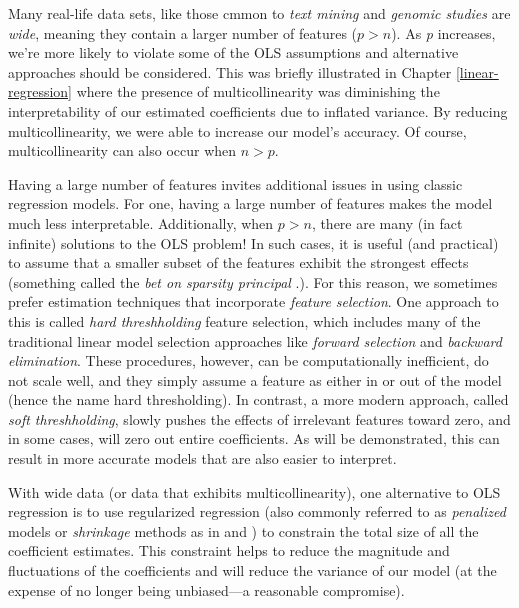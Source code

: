 \documentclass[]{krantz}
\begin{document}
Many real-life data sets, like those cmmon to \emph{text mining} and \emph{genomic studies} are \emph{wide}, meaning they contain a larger number of features (\(p > n\)). As \emph{p} increases, we're more likely to violate some of the OLS assumptions and alternative approaches should be considered. This was briefly illustrated in Chapter \ref{linear-regression} where the presence of multicollinearity was diminishing the interpretability of our estimated coefficients due to inflated variance. By reducing multicollinearity, we were able to increase our model's accuracy. Of course, multicollinearity can also occur when \(n > p\).

Having a large number of features invites additional issues in using classic regression models. For one, having a large number of features makes the model much less interpretable. Additionally, when \(p > n\), there are many (in fact infinite) solutions to the OLS problem! In such cases, it is useful (and practical) to assume that a smaller subset of the features exhibit the strongest effects (something called the \emph{bet on sparsity principal} \citep[see][p.~2]{hastie2015statistical}.). For this reason, we sometimes prefer estimation techniques that incorporate \emph{feature selection}. One approach to this is called \emph{hard threshholding} feature selection, which includes many of the traditional linear model selection approaches like \emph{forward selection} and \emph{backward elimination}. These procedures, however, can be computationally inefficient, do not scale well, and they simply assume a feature as either in or out of the model (hence the name hard thresholding). In contrast, a more modern approach, called \emph{soft threshholding}, slowly pushes the effects of irrelevant features toward zero, and in some cases, will zero out entire coefficients. As will be demonstrated, this can result in more accurate models that are also easier to interpret.

With wide data (or data that exhibits multicollinearity), one alternative to OLS regression is to use regularized regression (also commonly referred to as \emph{penalized} models or \emph{shrinkage} methods as in \citet{esl} and \citet{apm}) to constrain the total size of all the coefficient estimates. This constraint helps to reduce the magnitude and fluctuations of the coefficients and will reduce the variance of our model (at the expense of no longer being unbiased---a reasonable compromise).
\end{document}
